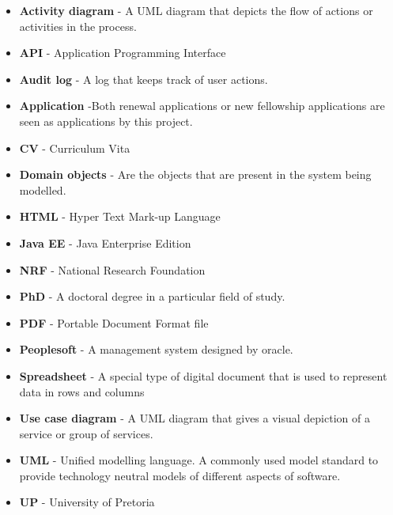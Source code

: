 \documentclass[12pt]{article}
\begin{document}
\begin{itemize}
\item \textbf{Activity diagram} - A UML diagram that depicts the flow of actions or activities in the process.
\item \textbf{API} - Application Programming Interface
\item \textbf{Audit log} - A log that keeps track of user actions.
\item \textbf{Application} -Both renewal applications or new fellowship applications are seen as applications by this project.
\item \textbf{CV} - Curriculum Vita
\item \textbf{Domain objects} - Are the objects that are present in the system being modelled.
\item \textbf{HTML} - Hyper Text Mark-up Language
\item \textbf{Java EE} - Java Enterprise Edition
\item \textbf{NRF} - National Research Foundation
\item \textbf{PhD} - A doctoral degree in a particular field of study.
\item \textbf{PDF} - Portable Document Format file
\item \textbf{Peoplesoft} - A management system designed by oracle. 
\item \textbf{Spreadsheet} - A special type of digital document that is used to represent data in rows and columns
\item \textbf{Use case diagram} - A UML diagram that gives a visual depiction of a service or group of services.
\item \textbf{UML} - Unified modelling language. A commonly used model standard to provide technology neutral models of different aspects of software.
\item \textbf{UP} - University of Pretoria
 


\end{itemize}	
\end{document}
